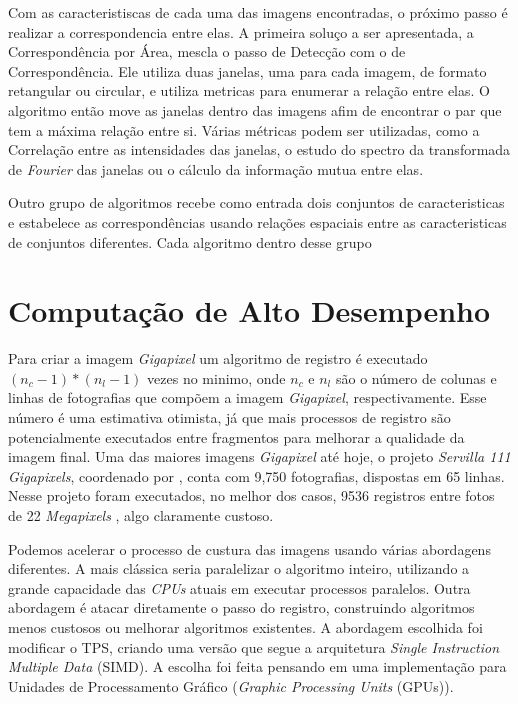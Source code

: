     Com as caracteristiscas de cada uma das imagens encontradas, o próximo passo é realizar a correspondencia entre elas.
A primeira soluço a ser apresentada, a Correspondência por Área, mescla o passo de Detecção com o de Correspondência. 
Ele utiliza duas janelas, uma para cada imagem, de formato retangular ou circular, e utiliza metricas para enumerar a 
relação entre elas. O algoritmo então move as janelas dentro das imagens afim de encontrar o par que tem a máxima
relação entre si. Várias métricas podem ser utilizadas, como a Correlação entre as intensidades das janelas, o estudo
do spectro da transformada de \textit{Fourier} das janelas ou o cálculo da informação mutua entre elas. 

 Outro grupo de algoritmos recebe como entrada dois conjuntos de caracteristicas e estabelece as correspondências
usando relações espaciais entre as caracteristicas de conjuntos diferentes. Cada algoritmo dentro desse grupo 


    
\section{Computação de Alto Desempenho}
    Para criar a imagem \textit{Gigapixel} um algoritmo de registro é executado $(n_c-1)*(n_l-1)$ vezes no minimo, 
onde $n_c$ e $n_l$ são o número de colunas e linhas de fotografias que compõem a imagem \textit{Gigapixel}, 
respectivamente. Esse número é uma estimativa otimista, já que mais processos de registro são potencialmente executados
entre fragmentos para melhorar a qualidade da imagem final. Uma das maiores imagens \textit{Gigapixel} até hoje, 
o projeto \textit{Servilla 111 Gigapixels}, coordenado por \cite{sevilla111},  conta com 9,750 fotografias, dispostas
em 65 linhas. Nesse projeto foram executados, no melhor dos casos, 9536 registros entre fotos de 22 \textit{Megapixels}
, algo claramente custoso.

    Podemos acelerar o processo de custura das imagens usando várias abordagens diferentes. A mais clássica seria
paralelizar o algoritmo inteiro, utilizando a grande capacidade das \textit{CPUs} atuais em executar processos paralelos.
Outra abordagem é atacar diretamente o passo do registro, construindo algoritmos menos custosos ou melhorar algoritmos
existentes. A abordagem escolhida foi modificar o TPS, criando uma versão que segue a arquitetura 
\textit{Single Instruction Multiple Data} (SIMD). A escolha foi feita pensando em uma implementação para 
Unidades de Processamento Gráfico (\textit{Graphic Processing Units} (GPUs)).

